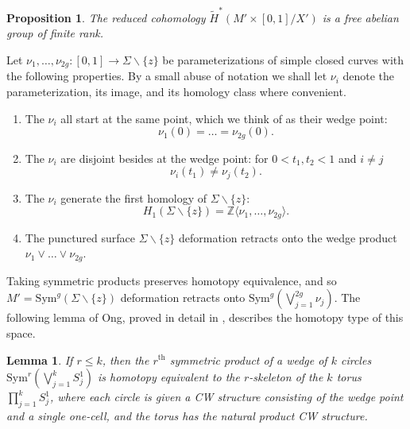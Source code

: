 \documentclass[11pt]{amsart}
\newtheorem{lemma}[theorem]{Lemma}
\newtheorem{proposition}[theorem]{Proposition}
\theoremstyle{definition}
\theoremstyle{remark}
\def\Z{\mathbb{Z}}
\def\Sym{\mathrm{Sym}}
\numberwithin{equation}{section}
\begin{document}
\begin{proposition}\label{coM'/X'freeabelianfiniterank}
    The reduced cohomology $\widetilde{H}^*(M'\times[0,1]/X')$ is a free abelian group of finite rank.
\end{proposition}
Let $\nu_1,\hdots,\nu_{2g}:[0,1]\to \Sigma\backslash\{z\}$ be parameterizations of simple closed curves with the following properties. By a small abuse of notation we shall let $\nu_i$ denote the parameterization, its image, and its homology class where convenient.
\begin{enumerate}
    \item The $\nu_i$ all start at the same point, which we think of as their wedge point: \[\nu_1(0)=\hdots =\nu_{2g}(0).\]
    \item The $\nu_i$ are disjoint besides at the wedge point: for  $0<t_1,t_2<1$ and $i\neq j$ \[\nu_i(t_1)\neq\nu_j(t_2).\]
    \item The $\nu_i$ generate the first homology of $\Sigma\backslash\{z\}$: \[H_1(\Sigma\backslash\{z\})=\Z\langle \nu_1,\hdots,\nu_{2g}\rangle.\] 
    \item The punctured surface $\Sigma\backslash\{z\}$ deformation retracts onto the wedge product $\nu_1\vee\hdots \vee \nu_{2g}$.
\end{enumerate}
Taking symmetric products preserves homotopy equivalence, and so $M'=\Sym^g(\Sigma\backslash\{z\})$ deformation retracts onto $\Sym^g(\bigvee_{j=1}^{2g}\nu_j)$. The following lemma of Ong, proved in detail in \cite{Hendricks2012rank}, describes the homotopy type of this space. 
\begin{lemma}\label{symprodwedgecirc}\cite[~Lemma 5.1]{Hendricks2012rank} If $r\le k$, then the $r^{\textrm{th}}$ symmetric product of a wedge of $k$ circles $\Sym^r(\bigvee_{j=1}^kS_j^1)$ 
is homotopy equivalent to the $r$-skeleton of the $k$ torus 
$\prod_{j=1}^kS_j^1$, where each circle is given a CW structure consisting of the wedge point and a single one-cell, and the torus has the natural product CW structure.
\end{lemma}
\end{document}

